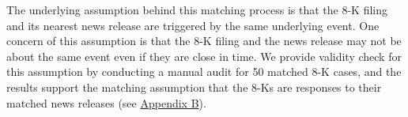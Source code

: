 \documentclass[letterpaper,12pt]{article}
\begin{document}
\begin{spacing}{1.5}
The underlying assumption behind this matching process is that the 8-K filing and its nearest news release are triggered by the same underlying event. One concern of this assumption is that the 8-K filing and the news release may not be about the same event even if they are close in time. We provide validity check for this assumption by conducting a manual audit for 50 matched 8-K cases, and the results support the matching assumption that the 8-Ks are responses to their matched news releases (see \hyperref[appb]{Appendix B}).


\end{spacing}
\end{document}

